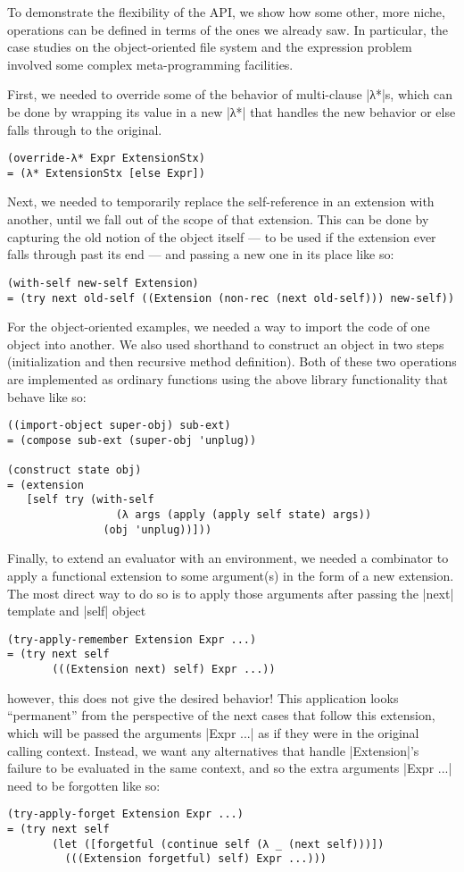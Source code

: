 To demonstrate the flexibility of the API, we show how some other, more niche, operations can be defined in terms of the ones we already saw.
In particular, the case studies on the object-oriented file system and the expression problem involved some complex meta-programming facilities.

First, we needed to override some of the behavior of multi-clause \scm|λ*|s, which can be done by wrapping its value in a new \scm|λ*| that handles the new behavior or else falls through to the original.
\begin{verbatim}
(override-λ* Expr ExtensionStx)
= (λ* ExtensionStx [else Expr])
\end{verbatim}
Next, we needed to temporarily replace the self-reference in an extension with another, until we fall out of the scope of that extension.
This can be done by capturing the old notion of the object itself --- to be used if the extension ever falls through past its end --- and passing a new one in its place like so:
\begin{verbatim}
(with-self new-self Extension)
= (try next old-self ((Extension (non-rec (next old-self))) new-self))
\end{verbatim}

For the object-oriented examples, we needed a way to import the code of one object into another.
We also used shorthand to construct an object in two steps (initialization and then recursive method definition).
Both of these two operations are implemented as ordinary functions using the above library functionality that behave like so:
\begin{verbatim}
((import-object super-obj) sub-ext)
= (compose sub-ext (super-obj 'unplug))

(construct state obj)
= (extension
   [self try (with-self
                 (λ args (apply (apply self state) args))
               (obj 'unplug))]))
\end{verbatim}

Finally, to extend an evaluator with an environment, we needed a combinator to apply a functional extension to some argument(s) in the form of a new extension.
The most direct way to do so is to apply those arguments after passing the \scm|next| template and \scm|self| object
\begin{verbatim}
(try-apply-remember Extension Expr ...)
= (try next self
       (((Extension next) self) Expr ...))
\end{verbatim}
however, this does not give the desired behavior!
This application looks ``permanent'' from the perspective of the next cases that follow this extension, which will be passed the arguments \scm|Expr ...| as if they were in the original calling context.
Instead, we want any alternatives that handle \scm|Extension|'s failure to be evaluated in the same context, and so the extra arguments \scm|Expr ...| need to be forgotten like so:
\begin{verbatim}
(try-apply-forget Extension Expr ...)
= (try next self
       (let ([forgetful (continue self (λ _ (next self)))])
         (((Extension forgetful) self) Expr ...)))
\end{verbatim}



